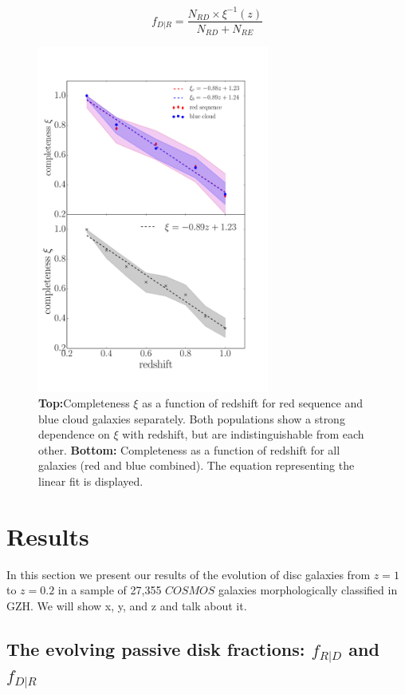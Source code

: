 \documentclass[useAMS,usenatbib]{mn2e}
\begin{document}
\begin{equation}
f_{D|R}=\frac{N_{RD}\times \xi^{-1}(z)}{N_{RD} + N_{RE}}
\label{eqn:frid}
\end{equation}


\begin{figure}
\centering
\includegraphics[width=3in,trim={0cm 2cm 2cm 1cm},clip]{figures/completenessmoneyplot.pdf}
\caption{\textbf{Top:}Completeness $\xi$ as a function of redshift for red sequence and blue cloud  galaxies separately. Both populations show a strong dependence on $\xi$ with redshift, but are indistinguishable from each other. \textbf{Bottom:} Completeness as a function of redshift for all   galaxies (red and blue combined). The equation representing the linear fit is displayed.}
\label{fig:xi}
\end{figure}

\section{Results}
\label{sec:Results}
In this section we present our results of the evolution of disc galaxies from $z=1$ to $z=0.2$ in a sample of 27,355 $COSMOS$ galaxies morphologically classified in GZH. We will show x, y, and z and talk about it. 

\subsection{The evolving passive disk fractions: $f_{R|D}$ and $f_{D|R}$} 
\end{document}
